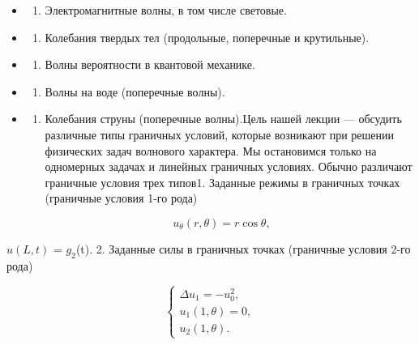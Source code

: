 \documentclass[
  ukrainian,
]{article}
\providecommand{\tightlist}{%
  \setlength{\itemsep}{0pt}\setlength{\parskip}{0pt}}
\begin{document}
\begin{itemize}
\tightlist
\item
  \begin{enumerate}
  \def\labelenumi{\arabic{enumi}.}
  \setcounter{enumi}{1}
  \tightlist
  \item
    Электромагнитные волны, в том числе световые.
  \end{enumerate}
\item
  \begin{enumerate}
  \def\labelenumi{\arabic{enumi}.}
  \setcounter{enumi}{2}
  \tightlist
  \item
    Колебания твердых тел (продольные, поперечные и крутильные).
  \end{enumerate}
\item
  \begin{enumerate}
  \def\labelenumi{\arabic{enumi}.}
  \setcounter{enumi}{3}
  \tightlist
  \item
    Волны вероятности в квантовой механике.
  \end{enumerate}
\item
  \begin{enumerate}
  \def\labelenumi{\arabic{enumi}.}
  \setcounter{enumi}{4}
  \tightlist
  \item
    Волны на воде (поперечные волны).
  \end{enumerate}
\item
  \begin{enumerate}
  \def\labelenumi{\arabic{enumi}.}
  \setcounter{enumi}{5}
  \tightlist
  \item
    Колебания струны (поперечные волны).Цель нашей лекции --- обсудить
    различные типы граничных условий, которые возникают при решении
    физических задач волнового характера. Мы остановимся только на
    одномерных задачах и линейных граничных условиях. Обычно различают
    граничные условия трех типов1. Заданные режимы в граничных точках
    (граничные условия 1-го рода)
  \end{enumerate}
\end{itemize}

\[
\qquad u_{\theta}(r, \theta) = r \cos \theta,
\]

\(u(L, t)\) = \(g_2\)(t). 2. Заданные силы в граничных точках (граничные
условия 2-го рода)

\[
\begin{cases} \Delta u_{1} = -u_{0}^{2}, \\ u_{1}(1, \theta) = 0, \\ u_{2}(1, \theta). \end{cases}
\]
\end{document}
